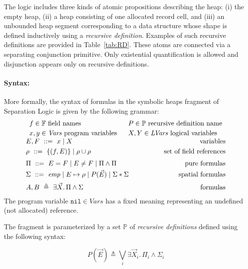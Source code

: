 \documentclass[twoside,11pt]{article}
\newcommand{\sep}{.\,}
\newcommand{\posep}{*}
\newcommand{\points}{\mapsto}
\newcommand{\vars}{\mathit{Vars}}
\newcommand{\lvars}{\mathit{LVars}}
\newcommand{\pfields}{\mathbb{F}}
\newcommand{\preds}{\mathbb{P}}
\newcommand{\nil}{\mathtt{nil}}
\begin{document}
The logic includes three kinds of atomic propositions describing the heap:
(i) the empty heap, 
(ii) a heap consisting of one allocated record cell, and
(iii) an unbounded heap segment corresponding to a data structure whose shape is defined inductively using a \emph{recursive definition}. 
Examples of such recursive definitions are provided in Table~\ref{tab:RD}.
These atoms are connected via a separating conjunction primitive. 
Only existential quantification is allowed and 
disjunction appears only on recursive definitions. 

\paragraph{Syntax:}
More formally, the syntax of formulas in the symbolic heaps fragment of Separation Logic
is given by the following grammar:
$$
\begin{array}{c}
\begin{array}{ll}
f \in \pfields \mbox{ field names} ~&~
P \in \preds \mbox{ recursive definition name}
\\[0.8mm]
x,y \in \vars \mbox{ program variables} ~&~
X,Y \in \lvars \mbox{ logical variables}
\end{array}
\\[2mm]
%
%
E,F\ ::=\ x \mid X 
\hfill \mbox{variables}
\\[1mm]
\rho\ ::=\ \{ (f,E) \} \mid \rho\cup\rho 
\hfill \mbox{set of field references}
\\[2mm]
%
\Pi\ ::=\ E = F \mid E \neq F \mid \Pi \land \Pi \hfill 
\mbox{pure formulas}\\[1mm]
%
\Sigma\ ::=\
\mathit{emp} \mid
E \points \rho \mid 
P(\vec{E}) \mid 
\Sigma \posep \Sigma 
%
\hspace{1cm}\hfill \mbox{spatial formulas}
\\[2mm]
A,B\ \triangleq\ \exists \vec{X}\sep \Pi\land\Sigma \hfill \mbox{formulas} %
\end{array}
$$
The program variable $\nil\in\vars$ has a fixed meaning representing an undefined (not allocated) reference.

The fragment is parameterized by a set $\preds$ of
\emph{recursive definitions} defined using the following syntax:

\begin{equation}\label{eq:RD}
P(\vec{E}) \triangleq \bigvee_i \exists \vec{X}_i\sep \Pi_i \land \Sigma_i
\end{equation}
\end{document}
